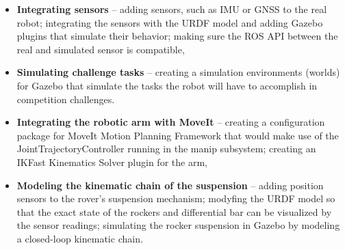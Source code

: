 \documentclass[english,inz,shortabstract]{iithesis}
\begin{document}
\begin{itemize}
	\item \textbf{Integrating sensors} -- adding sensors, such as IMU or GNSS to the real robot; integrating the sensors with the URDF model and adding Gazebo plugins that simulate their behavior; making sure the ROS API between the real and simulated sensor is compatible,
	\item \textbf{Simulating challenge tasks} -- creating a simulation environments (worlds) for Gazebo that simulate the tasks the robot will have to accomplish in competition challenges.
	\item \textbf{Integrating the robotic arm with MoveIt} -- creating a configuration package for MoveIt Motion Planning Framework that would make use of the \textsf{\mbox{JointTrajectoryController}} running in the \textsf{manip} subsystem; creating an IKFast Kinematics Solver plugin for the arm,
	\item \textbf{Modeling the kinematic chain of the suspension} -- adding position sensors to the rover's suspension mechanism; modyfing the URDF model so that the exact state of the rockers and differential bar can be visualized by the sensor readings; simulating the rocker suspension in Gazebo by modeling a closed-loop kinematic chain.
\end{itemize}



\end{document}
